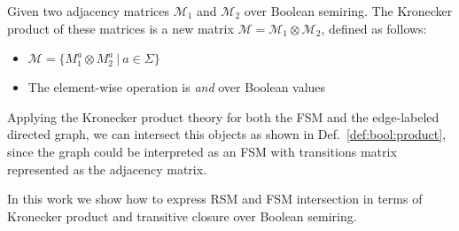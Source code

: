 \begin{definition}
\label{def:bool:product}
Given two adjacency matrices $\mathcal{M}_1$ and $\mathcal{M}_2$ over Boolean semiring. 
The Kronecker product of these matrices is a new matrix 
$\mathcal{M} = \mathcal{M}_1 \otimes \mathcal{M}_2$, defined as follows:
\begin{itemize}
    \item $\mathcal{M} = \{ M_1^a \otimes M_2^a~|~a \in \Sigma \}$
    \item The element-wise operation is \textit{and} over Boolean values
\end{itemize}
\end{definition}

Applying the Kronecker product theory for both the FSM and the edge-labeled directed graph, 
we can intersect this objects as shown in Def.~\ref{def:bool:product}, since the 
graph could be interpreted as an FSM with transitions matrix represented as 
the adjacency matrix.

In this work we show how to express RSM and FSM intersection in terms of 
Kronecker product and transitive closure over Boolean semiring.